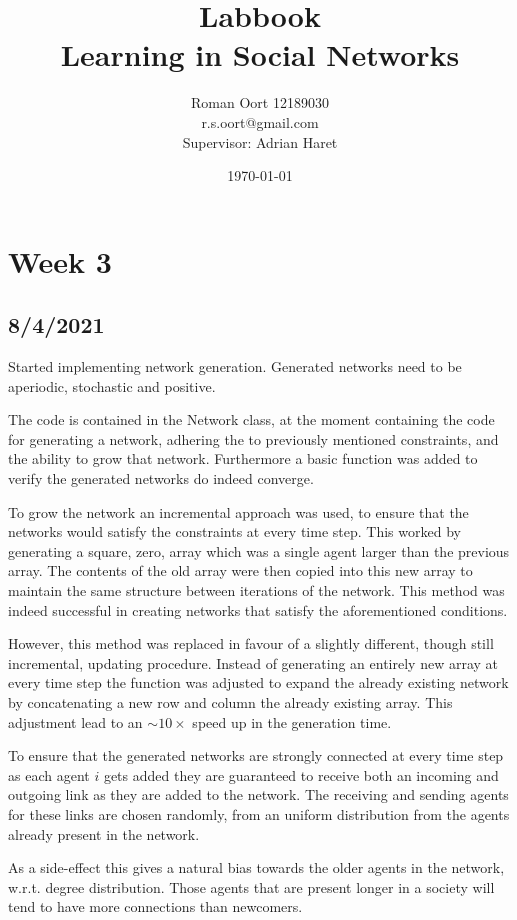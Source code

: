 \documentclass{article}
\title{Labbook \\ Learning in Social Networks}
\author{Roman Oort 12189030\\ r.s.oort@gmail.com\\[1cm]{\normal Supervisor: Adrian Haret}}
\date{\today}
\begin{document}
\maketitle

\newpage

\tableofcontents

\newpage

\section{Week 3}
\subsection{8/4/2021}
Started implementing network generation. Generated networks need to be aperiodic, stochastic and positive.

The code is contained in the Network class, at the moment containing the code for generating a network, adhering the to previously mentioned constraints, and the ability to grow that network. Furthermore a basic function was added to verify the generated networks do indeed converge. 

To grow the network an incremental approach was used, to ensure that the networks would satisfy the constraints at every time step. This worked by generating a square, zero, array which was a single agent larger than the previous array. The contents of the old array were then copied into this new array to maintain the same structure between iterations of the network.\newline
This method was indeed successful in creating networks that satisfy the aforementioned conditions.

However, this method was replaced in favour of a slightly different, though still incremental, updating procedure. Instead of generating an entirely new array at every time step the function was adjusted to expand the already existing network by concatenating a new row and column the already existing array. This adjustment lead to an $\sim 10 \times$ speed up in the generation time.

To ensure that the generated networks are strongly connected at every time step as each agent $i$ gets added they are guaranteed to receive both an incoming and outgoing link as they are added to the network. The receiving and sending agents for these links are chosen randomly, from an uniform distribution from the agents already present in the network.

As a side-effect this gives a natural bias towards the older agents in the network, w.r.t. degree distribution. Those agents that are present longer in a society will tend to have more connections than newcomers.
\end{document}

